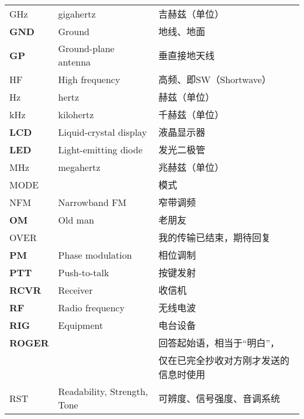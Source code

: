 \begin{longtable}[l]{lll}
  \unit{\GHz}    & gigahertz                            & 吉赫兹（单位）             \\
  \textbf{GND}   & Ground                               & 地线、地面               \\
  \textbf{GP}    & Ground-plane antenna                 & 垂直接地天线              \\
  HF             & High frequency                       & 高频、即SW（Shortwave）   \\
  Hz             & hertz                                & 赫兹（单位）              \\
  \unit{\kHz}    & kilohertz                            & 千赫兹（单位）             \\
  \textbf{LCD}   & Liquid-crystal display               & 液晶显示器               \\
  \textbf{LED}   & Light-emitting diode                 & 发光二极管               \\
  \unit{\MHz}    & megahertz                            & 兆赫兹（单位）             \\
  MODE           &                                      & 模式                  \\
  NFM            & Narrowband FM                        & 窄带调频                \\
  \textbf{OM}    & Old man                              & 老朋友                 \\%
  OVER           &                                      & 我的传输已结束，期待回复        \\
  \textbf{PM}    & Phase modulation                     & 相位调制                \\
  \textbf{PTT}   & Push-to-talk                         & 按键发射                \\
  \textbf{RCVR}  & Receiver                             & 收信机                 \\
  \textbf{RF}    & Radio frequency                      & 无线电波                \\
  \textbf{RIG}   & Equipment                            & 电台设备                \\
  \textbf{ROGER} &                                      & 回答起始语，相当于“明白”，      \\
                 &                                      & 仅在已完全抄收对方刚才发送的信息时使用 \\
  RST            & Readability, Strength, Tone          & 可辨度、信号强度、音调系统       \\

\end{longtable}
